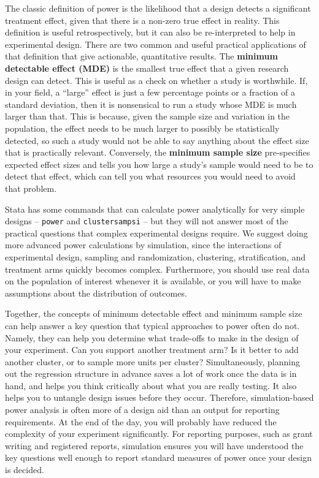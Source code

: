 The classic definition of power
is the likelihood that a design detects a significant treatment effect,
given that there is a non-zero true effect in reality.
This definition is useful retrospectively,
but it can also be re-interpreted to help in experimental design.
There are two common and useful practical applications
of that definition that give actionable, quantitative results.
The \textbf{minimum detectable effect (MDE)}
is the smallest true effect that a given research design can detect.
This is useful as a check on whether a study is worthwhile.
If, in your field, a ``large'' effect is just a few percentage points
or a fraction of a standard deviation,
then it is nonsensical to run a study whose MDE is much larger than that.
This is because, given the sample size and variation in the population,
the effect needs to be much larger to possibly be statistically detected,
so such a study would not be able to say anything about the effect size that is practically relevant.
Conversely, the \textbf{minimum sample size} pre-specifies expected effect sizes
and tells you how large a study's sample would need to be to detect that effect,
which can tell you what resources you would need to avoid that problem.

Stata has some commands that can calculate power analytically for
very simple designs -- \texttt{power} and \texttt{clustersampsi} --
but they will not answer most of the practical questions
that complex experimental designs require.
We suggest doing more advanced power calculations by simulation,
since the interactions of experimental design,
sampling and randomization,
clustering, stratification, and treatment arms
quickly becomes complex.
Furthermore, you should use real data on the population of interest whenever it is available,
or you will have to make assumptions about the distribution of outcomes.

Together, the concepts of minimum detectable effect
and minimum sample size can help answer a key question
that typical approaches to power often do not.
Namely, they can help you determine what trade-offs to make
in the design of your experiment.
Can you support another treatment arm?
Is it better to add another cluster,
or to sample more units per cluster?
Simultaneously, planning out the regression structure
in advance saves a lot of work once the data is in hand,
and helps you think critically about what you are really testing.
It also helps you to untangle design issues before they occur.
Therefore, simulation-based power analysis is often more of a design aid
than an output for reporting requirements.
At the end of the day, you will probably have reduced
the complexity of your experiment significantly.
For reporting purposes, such as grant writing and registered reports,
simulation ensures you will have understood the key questions well enough
to report standard measures of power once your design is decided.

